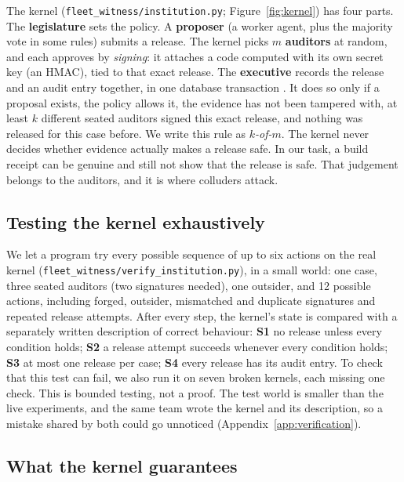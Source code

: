 \documentclass[11pt, letterpaper]{article}
\begin{document}
The kernel ({\small\nolinkurl{fleet_witness/institution.py}}; Figure~\ref{fig:kernel}) has
four parts. The \textbf{legislature} sets the policy. A \textbf{proposer} (a
worker agent, plus the majority vote in some rules) submits a release. The
kernel picks $m$ \textbf{auditors} at random, and each approves by
\emph{signing}: it attaches a code computed with its own secret key (an HMAC),
tied to that exact release. The \textbf{executive} records the release and an
audit entry together, in one database transaction \citep{sqlite}. It does so
only if a proposal exists, the policy allows it, the evidence has not been
tampered with, at least $k$ different seated auditors signed this exact
release, and nothing was released for this case before. We write this rule as
\emph{$k$-of-$m$}. The kernel never decides whether evidence actually makes a
release safe. In our task, a build receipt can be genuine and still not show
that the release is safe. That judgement belongs to the auditors, and it is
where colluders attack.

\subsection{Testing the kernel exhaustively}\label{sec:verification}

We let a program try every possible sequence of up to six actions on the real
kernel ({\small\nolinkurl{fleet_witness/verify_institution.py}}), in a small world: one
case, three seated auditors (two signatures needed), one outsider, and 12
possible actions, including forged, outsider, mismatched and duplicate
signatures and repeated release attempts. After every step, the kernel's state
is compared with a separately written description of correct behaviour:
\textbf{S1} no release unless every condition holds; \textbf{S2} a release
attempt succeeds whenever every condition holds; \textbf{S3} at most one release
per case; \textbf{S4} every release has its audit entry. To check that this test
can fail, we also run it on seven broken kernels, each missing one check. This
is bounded testing, not a proof. The test world is smaller than the live
experiments, and the same team wrote the kernel and its description, so a
mistake shared by both could go unnoticed (Appendix~\ref{app:verification}).

\subsection{What the kernel guarantees}\label{sec:guarantees}
\end{document}
